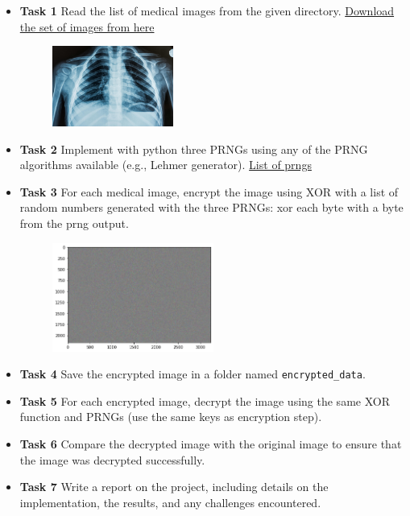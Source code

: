 \begin{itemize}
\item
  \textbf{Task 1} Read the list of medical images from the given directory. \href{https://ydjemmada.github.io/projects/proj2_images.zip}{Download the set of images from here}
  \begin{figure}[H]
    \centering
    \includegraphics[width=150px]{med_1.jpg} 
  \end{figure}
  \item
  \textbf{Task 2} Implement with python three PRNGs using any of the PRNG algorithms
  available (e.g., Lehmer generator).
  \href{https://en.wikipedia.org/wiki/List_of_random_number_generators}{List
  of prngs}
\item
  \textbf{Task 3} For each medical image, encrypt the image using XOR with a list of random numbers generated with the three PRNGs: xor each byte with a byte from the prng output.
  \begin{figure}[H]\centering
    \includegraphics[width=200px]{enc_med_1.png} 
  \end{figure}
\item
  \textbf{Task 4} Save the encrypted image in a folder named \verb|encrypted_data|.
\item
  \textbf{Task 5} For each encrypted image, decrypt the image using the same XOR function and PRNGs (use the same keys as encryption step).
\item
  \textbf{Task 6} Compare the decrypted image with the original image to ensure that the image was decrypted successfully.
\item
  \textbf{Task 7} Write a report on the project, including details on the implementation, the results, and any challenges encountered.
\end{itemize}
\newpage